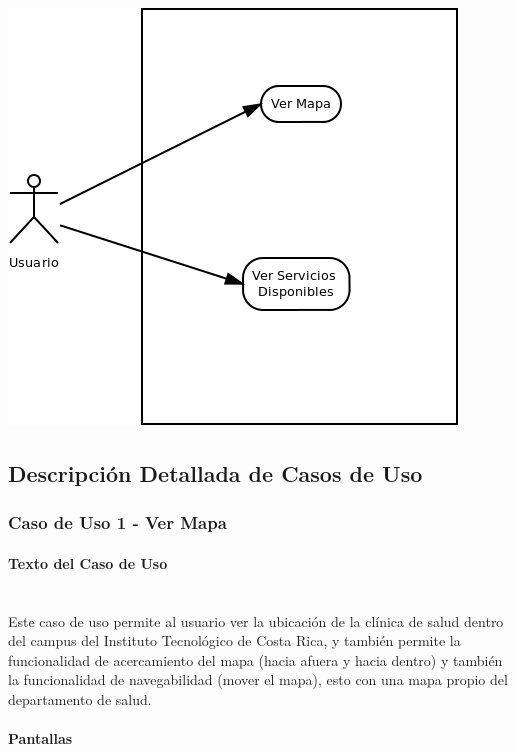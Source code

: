 \documentclass[12pt]{article}
\begin{document}
\includegraphics[width=\linewidth]{"../Documentos/Diagramas/casos de uso"}

\newpage
\subsection{Descripci\'on Detallada de Casos de Uso}

\subsubsection{Caso de Uso 1 - Ver Mapa}
\paragraph{Texto del Caso de Uso}\ \\

Este caso de uso permite al usuario ver la ubicaci\'on de la cl\'inica de salud dentro del campus del Instituto Tecnol\'ogico de Costa Rica, y tambi\'en permite la funcionalidad de acercamiento del mapa (hacia afuera y hacia dentro) y tambi\'en la funcionalidad de navegabilidad (mover el mapa), esto con una mapa propio del departamento de salud.

\paragraph{Pantallas}\ \\
\end{document}

